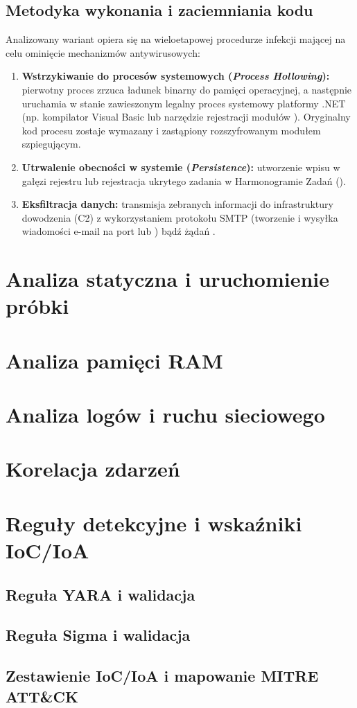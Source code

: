 \subsection{Metodyka wykonania i zaciemniania kodu}
Analizowany wariant opiera się na wieloetapowej procedurze infekcji mającej na celu ominięcie mechanizmów antywirusowych:
\begin{enumerate}
    \item \textbf{Wstrzykiwanie do procesów systemowych (\textit{Process Hollowing}):} pierwotny proces zrzuca ładunek binarny do pamięci operacyjnej, a następnie uruchamia w stanie zawieszonym legalny proces systemowy platformy .NET (np. kompilator Visual Basic  lub narzędzie rejestracji modułów ). Oryginalny kod procesu zostaje wymazany i zastąpiony rozszyfrowanym modułem szpiegującym.
    \item \textbf{Utrwalenie obecności w systemie (\textit{Persistence}):} utworzenie wpisu w gałęzi rejestru  lub rejestracja ukrytego zadania w Harmonogramie Zadań ().
    \item \textbf{Eksfiltracja danych:} transmisja zebranych informacji do infrastruktury dowodzenia (C2) z wykorzystaniem protokołu SMTP (tworzenie i wysyłka wiadomości e-mail na port  lub ) bądź żądań .
\end{enumerate}

\section{Analiza statyczna i uruchomienie próbki}\label{sec:cs1_triage}

\section{Analiza pamięci RAM}\label{sec:cs1_analiza_ram}

\section{Analiza logów i ruchu sieciowego}\label{sec:cs1_analiza_logow}

\section{Korelacja zdarzeń}\label{sec:cs1_korelacja}

\section{Reguły detekcyjne i wskaźniki IoC/IoA}\label{sec:cs1_inzynieria_detekcji}

\subsection{Reguła YARA i walidacja}\label{subsec:cs1_yara}

\subsection{Reguła Sigma i walidacja}\label{subsec:cs1_sigma}

\subsection{Zestawienie IoC/IoA i mapowanie MITRE ATT\&CK}\label{subsec:cs1_ioc_mitre}


